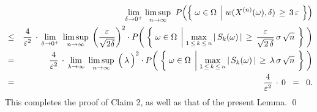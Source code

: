 \begin{eqnarray*}
&&
	\underset{\delta\rightarrow0^{+}}{\lim}\;
	\underset{n\rightarrow\infty}{\limsup}\;\;
	P\!\left(\left\{\;
	\omega\in\Omega
	\;\left\vert\;
		\overset{{\color{white}1}}{w}(X^{(n)}(\omega),\delta)\,\geq\,3\,\varepsilon
	\right.
	\;\right\}\right)
\\
&\leq&
	\dfrac{4}{\varepsilon^{2}} \,\cdot\,
	\underset{\delta\rightarrow0^{+}}{\lim}\;\,
	\underset{n\rightarrow\infty}{\limsup}\;
	\left(\dfrac{\varepsilon}{\sqrt{2\delta}}\right)^{2}\cdot
	P\!\left(\;\left\{\; \omega\in\Omega \;\left\vert\;
		\underset{1\,\leq\,k\,\leq\,n}{\max}
			\left\vert\, S_{k}(\omega) \,\right\vert
		\,\geq\,\dfrac{\varepsilon}{\sqrt{2\,\delta}}\,\sigma\,\sqrt{n}
		\right.\;\right\}
		\;\right)
\\
&=&
	\dfrac{4}{\varepsilon^{2}} \,\cdot\,
	\underset{\lambda\rightarrow\infty}{\lim}\;\,
	\underset{n\rightarrow\infty}{\limsup}\;
	\left(\,\overset{{\color{white}.}}{\lambda}\,\right)^{2}\cdot
	P\!\left(\;\left\{\; \omega\in\Omega \;\left\vert\;
		\underset{1\,\leq\,k\,\leq\,n}{\max}
			\left\vert\, S_{k}(\omega) \,\right\vert
		\,\geq\,\lambda\,\sigma\,\sqrt{n}
		\right.\;\right\}
		\;\right)
\\
&=& \dfrac{4}{\varepsilon^{2}} \,\cdot\, 0 \;\; = \;\; 0.
\end{eqnarray*}
This completes the proof of Claim 2, as well as that of the present Lemma.
\qed

